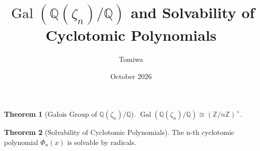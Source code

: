 \documentclass[12pt]{extarticle}
\title{$\operatorname{Gal}(\mathbb{Q}(\zeta_n)/\mathbb{Q})$ and Solvability of Cyclotomic Polynomials}
\author{Tomiwa}
\date{October 2026}
\theoremstyle{definition}
\newtheorem{thm}{Theorem}[section]
\begin{document}
\newcommand\at[2]{\left.#1\right|_{#2}}

\maketitle
\doublespacing
\newcommand{\chapquote}[3]{\begin{quotation} \textit{#1} \end{quotation} \begin{flushright} - #2, \textit{#3}\end{flushright} }
\setlength{\parindent}{0pt}
\newcommand{\lt}{ <}
\newcommand{\gt}{ >}
\newcommand{\labs}{\left\lvert}
\newcommand{\rabs}{\right\rvert}
\newcommand{\dbar}{\bar{\partial}}
\newcommand{\norm}[1]{\left\lVert#1\right\rVert}
\newcommand{\img}{\operatorname{im}}
\newcommand{\gal}{\operatorname{Gal}}
\begin{thm}[Galois Group of $\mathbb{Q}(\zeta_n)/\mathbb{Q}$]
$\gal(\mathbb{Q}(\zeta_n)/\mathbb{Q})\cong (\mathbb{Z}/n\mathbb{Z})^{\times}$.
\end{thm}
\begin{thm}[Solvability of Cyclotomic Polynomials]
    The n-th cyclotomic polynomial $\Phi_n(x)$ is solvable by radicals.
\end{thm}
\end{document}
